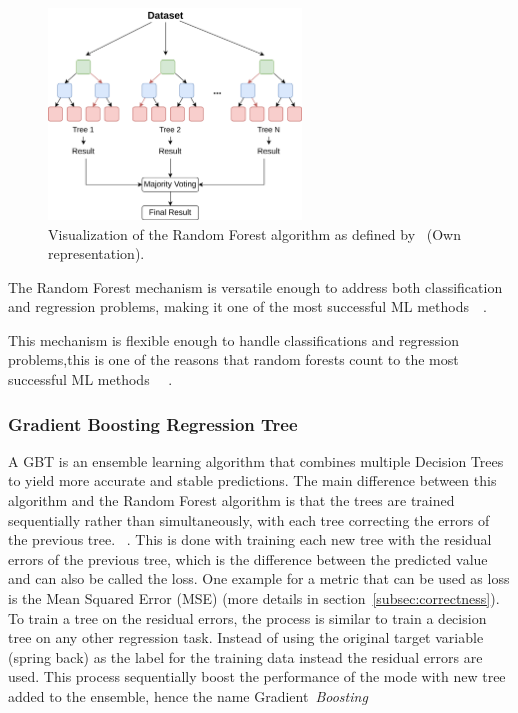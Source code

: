 {\begin{figure}[h]
    \begin{tcolorbox}[arc=0pt,boxrule=0.5pt]
        \centering
        \includegraphics[width=0.6\textwidth]{chap4/images/random_forest_example}
    \end{tcolorbox}
    \caption{Visualization of the Random Forest algorithm as defined by~\cite[p.1]{breiman_randomforests_2001} (Own
    representation).
    }
    \label{fig:rf-example}
\end{figure}

The Random Forest mechanism is versatile enough to address both classification and regression problems, making it one
of the most successful
\ac{ML} methods~\cite[p. 3--4]{biau_randomforestguided_2016}~\cite[p. 25]{breiman_randomforests_2001}.

This mechanism is flexible enough to handle classifications and regression problems,this is one of the reasons that
random forests count to the most successful \ac{ML}
methods
~\cite[p. 3--4]{biau_randomforestguided_2016}~\cite[p. 25]{breiman_randomforests_2001}.

\subsubsection{Gradient Boosting Regression Tree}

A \ac{GBT} is an ensemble learning algorithm that combines multiple Decision Trees
to yield more accurate and stable predictions.
The main difference between this algorithm and the Random Forest algorithm is that the trees are trained sequentially
rather than simultaneously, with each tree correcting the errors of the previous tree.
~\cite[p. 88--89]{muller_introductionmachinelearning_2016}.
This is done with training each new tree with the residual errors of the previous tree, which is the
difference between the predicted value and can also be called the loss.
One example for a metric that can be used as loss is the Mean Squared Error (MSE) (more details in
section~\ref{subsec:correctness}).
To train a tree on the residual errors, the process is similar to train a decision tree on any other regression
task.
Instead of using the original target variable (spring back) as the label for the training data instead the
residual errors are used.
This process sequentially boost the performance of the mode with new tree added to the
ensemble, hence the name Gradient~\textit{Boosting}
~\cite[p. 222]{boehmke2019hands}

}
